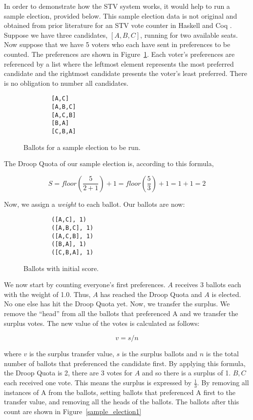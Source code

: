 In order to demonstrate how the STV system works, it would help to run a sample
election, provided below. This sample election data is not original and obtained
from prior literature for an STV vote counter in Haskell and Coq
\cite{stv_haskell}. Suppose we have three candidates, $[A, B, C]$, running for
two available seats. Now suppose that we have 5 voters who each have sent in
preferences to be counted. The preferences are shown in
Figure~\ref{sample_election}. Each voter's preferences are referenced by a list
where the leftmost element represents the most preferred candidate and the
rightmost candidate presents the voter's least preferred. There is no obligation
to number all candidates. 


\begin{figure}[ht!!!!!!!!]
    \caption{Ballots for a sample election to be run. }
    \label{sample_election}
    \begin{lstlisting}
        [A,C]
        [A,B,C]
        [A,C,B]
        [B,A]
        [C,B,A]
    \end{lstlisting}
\end{figure}

The Droop Quota of our sample election is, according to this formula, 

$$
S = floor(\frac{5}{2 + 1}) + 1 = floor(\frac{5}{3}) + 1 = 1 + 1 = 2
$$

Now, we assign a \textit{weight} to each ballot. Our ballots are now: 

\begin{figure}[ht!!!!!!!!]
    \caption{Ballots with initial score.}
    \label{sample_election0}
    \begin{lstlisting}
        ([A,C], 1)
        ([A,B,C], 1)
        ([A,C,B], 1)
        ([B,A], 1)
        ([C,B,A], 1)
    \end{lstlisting}
\end{figure}

We now start by counting everyone's first preferences. $A$ receives 3 ballots
each with the weight of 1.0. Thus, $A$ has reached the Droop Quota and $A$ is
elected. No one else has hit the Droop Quota yet. Now, we transfer the surplus.
We remove the ``head'' from all the ballots that preferenced A and we transfer
the surplus votes. The new value of the votes is calculated as follows: 

$$
v = s/n
$$

where $v$ is the surplus transfer value, $s$ is the surplus ballots and $n$ is
the total number of ballots that preferenced the candidate first. By applying
this formula, the Droop Quota is 2, there are 3 votes for $A$ and so there is a
surplus of 1. $B, C$ each received one vote. This means the surplus is expressed
by $\frac{1}{3}$. By removing all instances of A from the ballots, setting
ballots that preferenced A first to the transfer value, and removing all the
heads of the ballots. The ballots after this count are shown in
Figure~\ref{sample_election1}

